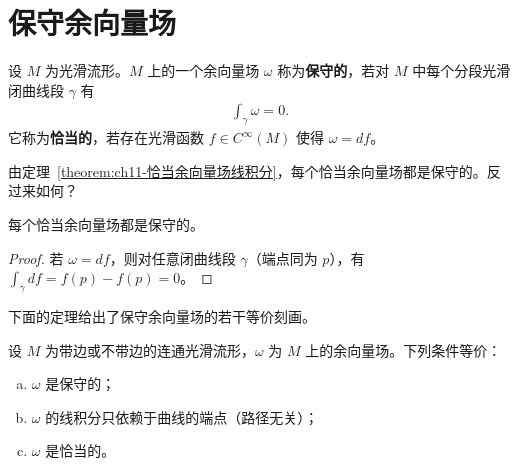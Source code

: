 \documentclass[../../main.tex]{subfiles}
\begin{document}
\section{保守余向量场}\label{section:ch11-保守余向量场}

设 $M$ 为光滑流形。$M$ 上的一个余向量场 $\omega$ 称为\textbf{保守的}，若对 $M$ 中每个分段光滑闭曲线段 $\gamma$ 有
\begin{align*}
\int_\gamma\omega=0.
\end{align*}
它称为\textbf{恰当的}，若存在光滑函数 $f\in C^\infty(M)$ 使得 $\omega=df$。

由定理~\ref{theorem:ch11-恰当余向量场线积分}，每个恰当余向量场都是保守的。反过来如何？

\begin{proposition}\label{proposition:ch11-恰当蕴含保守}
每个恰当余向量场都是保守的。
\end{proposition}

\begin{proof}
若 $\omega=df$，则对任意闭曲线段 $\gamma$（端点同为 $p$），有 $\int_\gamma df=f(p)-f(p)=0$。
\end{proof}

下面的定理给出了保守余向量场的若干等价刻画。

\begin{theorem}\label{theorem:ch11-保守等价刻画}
设 $M$ 为带边或不带边的连通光滑流形，$\omega$ 为 $M$ 上的余向量场。下列条件等价：
\begin{enumerate}[(a)]
\item $\omega$ 是保守的；
\item $\omega$ 的线积分只依赖于曲线的端点（路径无关）；
\item $\omega$ 是恰当的。
\end{enumerate}
\end{theorem}
\end{document}
